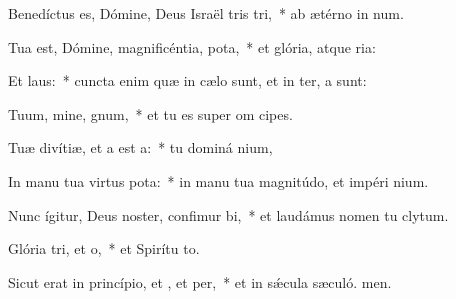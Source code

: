 \item Benedíctus es, Dómine, Deus Israël tris tri,~* ab ætérno in num.
\item Tua est, Dómine, magnificéntia,  pota,~* et glória, atque ria:
\item Et  laus:~* cuncta enim quæ in cælo sunt, et in ter, a sunt:
\item Tuum, mine, gnum,~* et tu es super om cipes.
\item Tuæ divítiæ, et a est a:~* tu dominá nium,
\item In manu tua virtus  pota:~* in manu tua magnitúdo, et impéri nium.
\item Nunc ígitur, Deus noster, confimur bi,~* et laudámus nomen tu clytum.
\item Glória tri, et o,~* et Spirítu to.
\item Sicut erat in princípio, et , et per,~* et in sǽcula sæculó. men.
